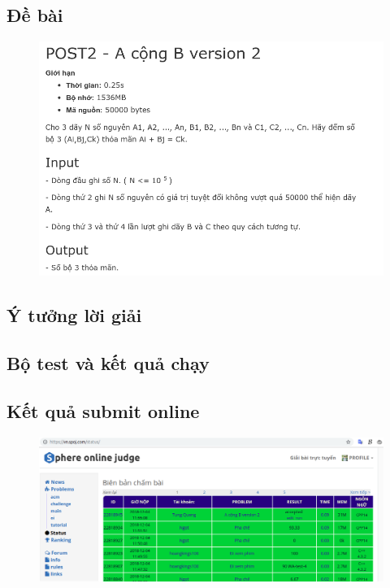 \documentclass[../report.tex]{subfiles}
\begin{document}
\subsection{Đề bài} \cite{a-plus-b}
\begin{figure}[H]
\centering
\includegraphics[width=\textwidth]{figures/a-plus-b.png}
\end{figure}

\subsection{Ý tưởng lời giải}

\subsection{Bộ test và kết quả chạy} 

\subsection{Kết quả submit online}
\begin{figure}[H]
\centering
\includegraphics[width=\textwidth]{figures/submit-a-plus-b.png}
\end{figure}
\end{document}
